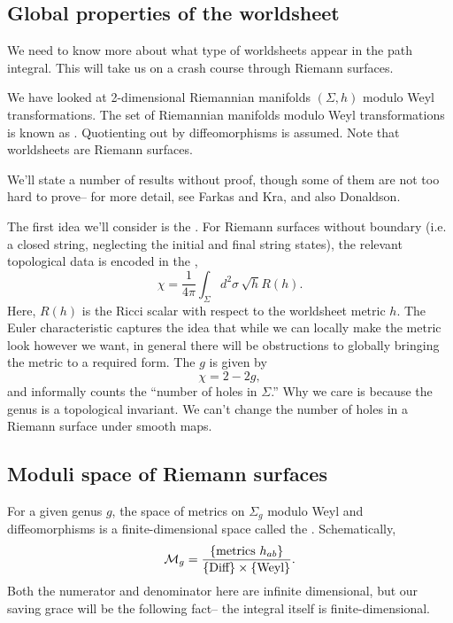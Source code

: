 \subsection*{Global properties of the worldsheet} We need to know more about what type of worldsheets appear in the path integral. This will take us on a crash course through Riemann surfaces.

We have looked at 2-dimensional Riemannian manifolds $(\Sigma,h)$ modulo Weyl transformations. The set of Riemannian manifolds modulo Weyl transformations is known as . Quotienting out by diffeomorphisms is assumed. Note that worldsheets are Riemann surfaces.

We'll state a number of results without proof, though some of them are not too hard to prove-- for more detail, see Farkas and Kra, and also Donaldson.

The first idea we'll consider is the . For Riemann surfaces without boundary (i.e. a closed string, neglecting the initial and final string states), the relevant topological data is encoded in the ,
\begin{equation}
    \chi = \frac{1}{4\pi} \int_\Sigma d^2 \sigma \,\sqrt{h} R(h).
\end{equation}
Here, $R(h)$ is the Ricci scalar with respect to the worldsheet metric $h$. The Euler characteristic captures the idea that while we can locally make the metric look however we want, in general there will be obstructions to globally bringing the metric to a required form. The  $g$ is given by
\begin{equation}
    \chi = 2-2g,
\end{equation}
and informally counts the ``number of holes in $\Sigma$.'' Why we care is because the genus is a topological invariant. We can't change the number of holes in a Riemann surface under smooth maps.

\subsection*{Moduli space of Riemann surfaces} For a given genus $g$, the space of metrics on $\Sigma_g$ modulo Weyl and diffeomorphisms is a finite-dimensional space called the . Schematically,
\begin{equation*}
    \mathcal{M}_g = \frac{\{\text{metrics }h_{ab}\}}{\{\text{Diff}\}\times \{\text{Weyl}\}}.
\end{equation*}
Both the numerator and denominator here are infinite dimensional, but our saving grace will be the following fact-- the integral itself is finite-dimensional.

